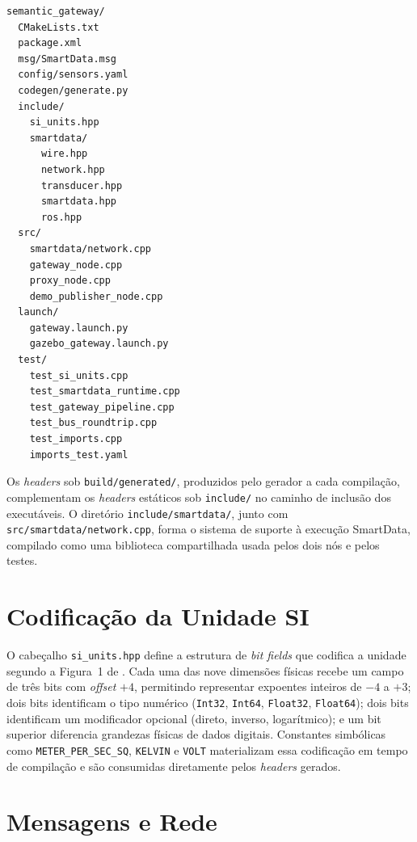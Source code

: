 \documentclass[
    12pt,
    oneside,
    a4paper,
    chapter=TITLE,
    section=TITLE,
    english,
    brazil
]{abntex2}
\begin{document}
\begin{lstlisting}[caption={Estrutura de diretórios do pacote
semantic\_gateway}, label=lst:estrutura]
semantic_gateway/
  CMakeLists.txt
  package.xml
  msg/SmartData.msg
  config/sensors.yaml
  codegen/generate.py
  include/
    si_units.hpp
    smartdata/
      wire.hpp
      network.hpp
      transducer.hpp
      smartdata.hpp
      ros.hpp
  src/
    smartdata/network.cpp
    gateway_node.cpp
    proxy_node.cpp
    demo_publisher_node.cpp
  launch/
    gateway.launch.py
    gazebo_gateway.launch.py
  test/
    test_si_units.cpp
    test_smartdata_runtime.cpp
    test_gateway_pipeline.cpp
    test_bus_roundtrip.cpp
    test_imports.cpp
    imports_test.yaml
\end{lstlisting}

Os \textit{headers} sob \texttt{build/generated/}, produzidos pelo
gerador a cada compilação, complementam os \textit{headers} estáticos
sob \texttt{include/} no caminho de inclusão dos executáveis. O diretório
\texttt{include/smartdata/}, junto com \texttt{src/smartdata/network.cpp},
forma o sistema de suporte à execução SmartData, compilado como uma
biblioteca compartilhada usada pelos dois nós e pelos testes.

\section{Codificação da Unidade SI}
\label{sec:siimpl}

O cabeçalho \texttt{si\_units.hpp} define a estrutura de \textit{bit
fields} que codifica a unidade segundo a Figura~1 de
. Cada uma das nove dimensões físicas
recebe um campo de três bits com \textit{offset} \(+4\), permitindo
representar expoentes inteiros de \(-4\) a \(+3\); dois bits identificam
o tipo numérico (\texttt{Int32}, \texttt{Int64}, \texttt{Float32},
\texttt{Float64}); dois bits identificam um modificador opcional
(direto, inverso, logarítmico); e um bit superior diferencia grandezas
físicas de dados digitais. Constantes simbólicas como
\texttt{METER\_PER\_SEC\_SQ}, \texttt{KELVIN} e \texttt{VOLT}
materializam essa codificação em tempo de compilação e são consumidas
diretamente pelos \textit{headers} gerados.

\section{Mensagens e Rede}
\label{sec:wireimpl}
\end{document}
